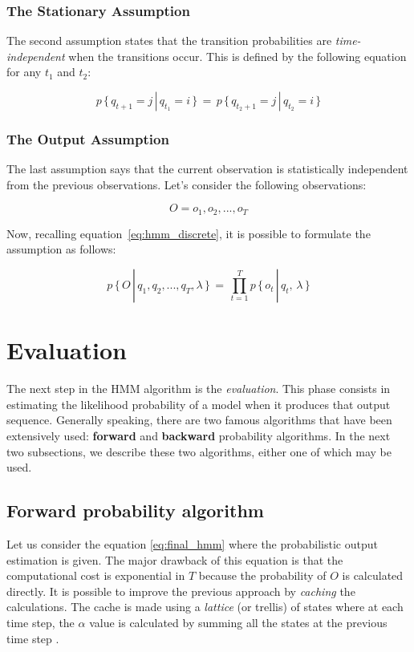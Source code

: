 \subsubsection{The Stationary Assumption}
The second assumption states that the transition probabilities are \textit{time-independent} when the transitions occur. This is defined by the following equation for any $t_{1}$ and $t_{2}$:

\begin{equation}
	p \, \{\, q_{t+1} = j \,|\, q_{t_{1}} = i\, \}\, = \,p \,\{\, q_{t_{2}+1} = j \,|\, q_{t_{2}} = i\, \}
\end{equation}

\subsubsection{The Output Assumption}
The last assumption says that the current observation is statistically independent from the previous observations. Let's consider the following observations:

\begin{equation}
	O = o_{1}, o_{2}, ... , o_{T}
\end{equation}

\noindent Now, recalling equation~\ref{eq:hmm_discrete}, it is possible to formulate the assumption as follows:

\begin{equation}
\label{eq:final_hmm}
	p \, \{\, O \, |\, q_{1},q_{2}, ... , q_{T}, \lambda \,\}\, = \, \prod_{t = 1}^{T} p \, \{ \, o_{t} \, | \, q_{t}, \, \lambda \,\}
\end{equation}

\section{Evaluation}
The next step in the HMM algorithm is the \textit{evaluation}. This phase consists in estimating the likelihood probability of a model when it produces that output sequence. Generally speaking, there are two famous algorithms that have been extensively used: \textbf{forward} and \textbf{backward} probability algorithms. In the next two subsections, we describe these two algorithms, either one of which may be used.

\subsection{Forward probability algorithm}
Let us consider the equation \ref{eq:final_hmm} where the probabilistic output estimation is given. The major drawback of this equation is that the computational cost is exponential in $T$ because the probability of $O$ is calculated directly. It is possible to improve the previous approach by \textit{caching} the calculations. The cache is made using a \textit{lattice} (or trellis) of states where at each time step, the $\alpha$ value is calculated by summing all the states at the previous time step \cite{bourlard1994hidden}. \\

